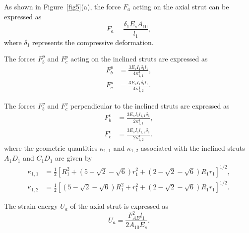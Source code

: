 \documentclass[12pt,a4paper]{article}
\begin{document}
	As shown in Figure~\ref{fig5}(a), the force $F_a$ acting on the axial strut can be expressed as
	\begin{equation}
		F_a = \frac{\delta_1 E_s A_{10}}{l_1},
		\label{Eq9}
	\end{equation}
	where $\delta_1$ represents the compressive deformation.
	
	The forces $F_b^p$ and $F_c^p$ acting on the inclined struts are expressed as
	\begin{equation}
		\begin{aligned}
			F_b^p &= \frac{3E_s I_1 \delta_1 l_1}{4\kappa_{1,1}^4}, \\
			F_c^p &= \frac{3E_s I_1 \delta_1 l_1}{4\kappa_{1,2}^4}.
		\end{aligned}
		\label{Eq10}
	\end{equation}
	
	The forces $F_b^v$ and $F_c^v$ perpendicular to the inclined struts are expressed as
	\begin{equation}
		\begin{aligned}
			F_b^v &= \frac{3E_s I_1 l_{1,1}\delta_1}{2\kappa_{1,1}^4}, \\
			F_c^v &= \frac{3E_s I_1 l_{1,2}\delta_1}{2\kappa_{1,2}^4}.
		\end{aligned}
		\label{Eq11}
	\end{equation}
	where the geometric quantities $\kappa_{1,1}$ and $\kappa_{1,2}$ associated with the inclined struts $A_1D_1$ and $C_1D_1$ are given by
	\[
	\begin{aligned}
		\kappa_{1,1}
		&=
		\frac{1}{2}
		\left[
		R_1^2
		+\left(5-\sqrt{2}-\sqrt{6}\right)r_1^2
		+\left(2-\sqrt{2}-\sqrt{6}\right)R_1r_1
		\right]^{1/2}, \\[0.5em]
		\kappa_{1,2}
		&=
		\frac{1}{2}
		\left[
		\left(5-\sqrt{2}-\sqrt{6}\right)R_1^2
		+r_1^2
		+\left(2-\sqrt{2}-\sqrt{6}\right)R_1r_1
		\right]^{1/2}.
	\end{aligned}
	\]
	
	The strain energy $U_a$ of the axial strut is expressed as
	\begin{equation}
		U_a = \frac{F_{AB}^2 l_1}{2A_{10}E_s}.
		\label{Eq12}
	\end{equation}
	
\end{document}

